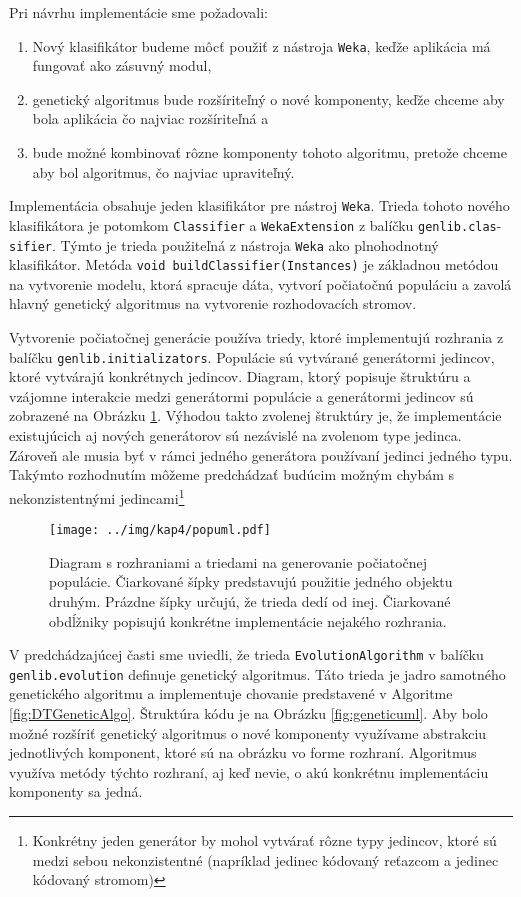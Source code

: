 Pri návrhu implementácie sme požadovali:
\begin{enumerate}
\item Nový klasifikátor budeme môcť použiť z nástroja \verb|Weka|, keďže aplikácia má fungovať ako zásuvný modul,
\item genetický algoritmus bude rozšíriteľný o nové komponenty, keďže chceme aby bola aplikácia čo najviac rozšíriteľná a
\item bude možné kombinovať rôzne komponenty tohoto algoritmu, pretože chceme aby bol algoritmus, čo najviac upraviteľný.
\end{enumerate}

Implementácia obsahuje jeden klasifikátor pre nástroj \verb|Weka|. Trieda tohoto nového klasifikátora je potomkom \verb|Classifier| a \verb|WekaExtension| z balíčku \verb|genlib.clas|- \verb|sifier|. Týmto je trieda použiteľná z nástroja \verb|Weka| ako plnohodnotný klasifikátor. Metóda \verb|void buildClassifier(Instances)| je základnou metódou na vytvorenie modelu, ktorá spracuje dáta, vytvorí počiatočnú populáciu a zavolá hlavný genetický algoritmus na vytvorenie rozhodovacích stromov. 

Vytvorenie počiatočnej generácie používa triedy, ktoré implementujú rozhrania z balíčku \verb|genlib.initializators|. Populácie sú vytvárané generátormi jedincov, ktoré vytvárajú konkrétnych jedincov. Diagram, ktorý popisuje štruktúru a vzájomne interakcie medzi generátormi populácie a generátormi jedincov sú zobrazené na Obrázku \ref{fig:popuml}. Výhodou takto zvolenej štruktúry je, že implementácie existujúcich aj nových generátorov sú nezávislé na zvolenom type jedinca. Zároveň ale musia byť v rámci jedného generátora používaní jedinci jedného typu. Takýmto rozhodnutím môžeme predchádzať budúcim možným chybám s nekonzistentnými jedincami\footnote{Konkrétny jeden generátor by mohol vytvárať rôzne typy jedincov, ktoré sú medzi sebou nekonzistentné (napríklad jedinec kódovaný reťazcom a jedinec kódovaný stromom)}

\begin{figure}[h]
\centering
\centerline{\mbox{\texttt{[image: ../img/kap4/popuml.pdf]}}}
\caption{Diagram s rozhraniami a triedami na generovanie počiatočnej populácie. Čiarkované šípky predstavujú použitie jedného objektu druhým. Prázdne šípky určujú, že trieda dedí od inej. Čiarkované obdĺžniky popisujú konkrétne implementácie nejakého rozhrania.}\label{fig:popuml}
\end{figure}

V predchádzajúcej časti sme uviedli, že trieda \verb|EvolutionAlgorithm| v balíčku \verb|genlib.evolution| definuje genetický algoritmus. Táto trieda je jadro samotného genetického algoritmu a implementuje chovanie predstavené v Algoritme \ref{fig:DTGeneticAlgo}. Štruktúra kódu je na Obrázku \ref{fig:geneticuml}. Aby bolo možné rozšíriť genetický algoritmus o nové komponenty využívame abstrakciu jednotlivých komponent, ktoré sú na obrázku vo forme rozhraní. Algoritmus využíva metódy týchto rozhraní, aj keď nevie, o akú konkrétnu implementáciu komponenty sa jedná.

